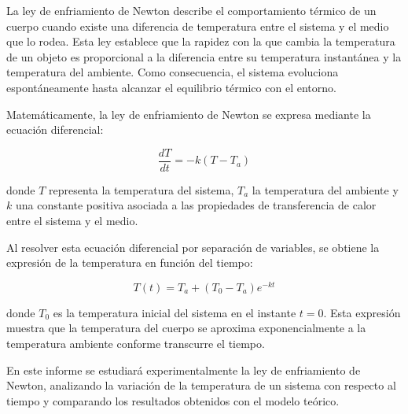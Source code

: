 La ley de enfriamiento de Newton describe el comportamiento térmico de un cuerpo cuando existe una diferencia de temperatura entre el sistema y el medio que lo rodea. Esta ley establece que la rapidez con la que cambia la temperatura de un objeto es proporcional a la diferencia entre su temperatura instantánea y la temperatura del ambiente. Como consecuencia, el sistema evoluciona espontáneamente hasta alcanzar el equilibrio térmico con el entorno.

Matemáticamente, la ley de enfriamiento de Newton se expresa mediante la ecuación diferencial:

\begin{equation}
\frac{dT}{dt}=-k(T-T_a)
\end{equation}

donde $T$ representa la temperatura del sistema, $T_a$ la temperatura del ambiente y $k$ una constante positiva asociada a las propiedades de transferencia de calor entre el sistema y el medio.

Al resolver esta ecuación diferencial por separación de variables, se obtiene la expresión de la temperatura en función del tiempo:

\begin{equation}
T(t)=T_a+(T_0-T_a)e^{-kt}
\end{equation}

donde $T_0$ es la temperatura inicial del sistema en el instante $t=0$. Esta expresión muestra que la temperatura del cuerpo se aproxima exponencialmente a la temperatura ambiente conforme transcurre el tiempo.

En este informe se estudiará experimentalmente la ley de enfriamiento de Newton, analizando la variación de la temperatura de un sistema con respecto al tiempo y comparando los resultados obtenidos con el modelo teórico.\cite{cengel2002thermodynamics}
